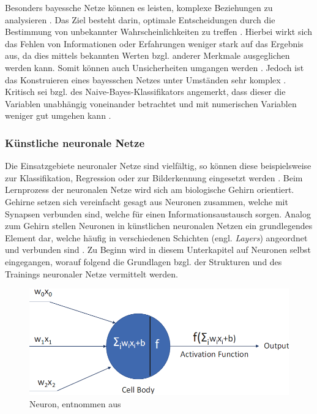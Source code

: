 Besonders bayessche Netze können es leisten, komplexe Beziehungen zu analysieren \cite{dehen2012bayes}. Das Ziel besteht darin, optimale Entscheidungen durch die Bestimmung von unbekannter Wahrscheinlichkeiten zu treffen \cite{Dorn.2018}. Hierbei wirkt sich das Fehlen von Informationen oder Erfahrungen weniger stark auf das Ergebnis aus, da dies mittels bekannten Werten bzgl. anderer Merkmale ausgeglichen werden kann. Somit können auch Unsicherheiten umgangen werden \cite{dehen2012bayes}. Jedoch ist das Konstruieren eines bayesschen Netzes unter Umständen sehr komplex \cite{wittig2002maschinelles}. Kritisch sei bzgl. des Naive-Bayes-Klassifikators angemerkt, dass dieser die Variablen unabhängig voneinander betrachtet und mit numerischen Variablen weniger gut umgehen kann \cite{Verdhan.2020}.

\subsubsection{Künstliche neuronale Netze}
Die Einsatzgebiete neuronaler Netze sind vielfältig, so können diese beispielsweise zur Klassifikation, Regression oder zur Bilderkennung eingesetzt werden \cite{ayodele, Ng.2018}. Beim Lernprozess der neuronalen Netze wird sich am biologische Gehirn orientiert. Gehirne setzen sich vereinfacht gesagt aus Neuronen zusammen, welche mit Synapsen verbunden sind, welche für einen Informationsaustausch sorgen. Analog zum Gehirn stellen Neuronen in künstlichen neuronalen Netzen ein grundlegendes Element dar, welche häufig in verschiedenen Schichten (engl. \emph{Layers}) angeordnet und verbunden sind \cite{Choo.2020}. Zu Beginn wird in diesem Unterkapitel auf Neuronen selbst eingegangen, worauf folgend die Grundlagen bzgl. der Strukturen und des Trainings neuronaler Netze vermittelt werden.

\begin{figure}
    \centering
    \includegraphics[scale=0.4]{pic/MA-Bilder/Neuron.PNG}
    \caption{Neuron, entnommen aus \cite{Verdhan.2020}}
    \label{Fig:neuron}
\end{figure}

